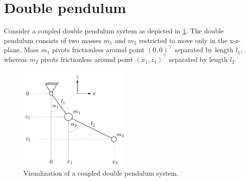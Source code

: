 \documentclass{report}
\numberwithin{tm}{section}
\begin{document}
\section{Double pendulum}
Consider a coupled double pendulum system as depicted in \cref{fig:doublependulum}. The double pendulum consists of two masses $m_1$ and $m_2$ restricted to move only in the x-z-plane. Mass $m_1$ pivots frictionless around point $(0, 0)^\top$ separated by length $l_1$, whereas $m_2$ pivots frictionless around point $(x_1,z_1)^\top$ separated by length $l_2$.
\begin{figure}[h]
	\centering
	\includegraphics[width=0.5\textwidth]{figures/doublependulum.pdf}
	\caption{Visualization of a coupled double pendulum system.}
	\label{fig:doublependulum}
\end{figure}
\end{document}
